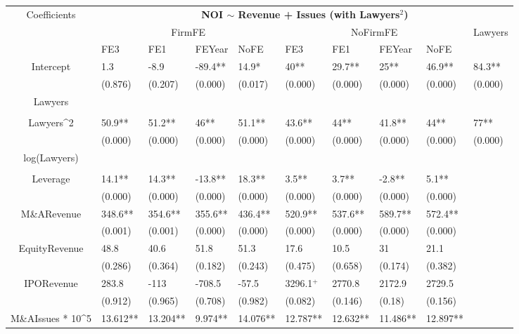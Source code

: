 \documentclass{article}
\begin{document}
\begin{table}[H]
\centering
\begin{tabular}{|clllllllll|}
\hline
\multirow{3}{*}{Coefficients} & \multicolumn{9}{c|}{\textbf{NOI $\sim$ Revenue + Issues (with Lawyers$^2$)}} \\
\cline{2-10}
& \multicolumn{4}{c}{FirmFE} & \multicolumn{4}{c}{NoFirmFE} & \multirow{2}{*}{Lawyers} \\
\cline{2-9}
& FE3 & FE1 & FEYear & NoFE & FE3 & FE1 & FEYear & NoFE &  \\
\hline
 
Intercept & 1.3 & -8.9 & -89.4** & 14.9* & 40** & 29.7** & 25** & 46.9** & 84.3** \\ 
   & (0.876) & (0.207) & (0.000) & (0.017) & (0.000) & (0.000) & (0.000) & (0.000) & (0.000) \\ 
  Lawyers &  &  &  &  &  &  &  &  &  \\ 
   &  &  &  &  &  &  &  &  &  \\ 
  Lawyers^2 & 50.9** & 51.2** & 46** & 51.1** & 43.6** & 44** & 41.8** & 44** & 77** \\ 
   & (0.000) & (0.000) & (0.000) & (0.000) & (0.000) & (0.000) & (0.000) & (0.000) & (0.000) \\ 
  log(Lawyers) &  &  &  &  &  &  &  &  &  \\ 
   &  &  &  &  &  &  &  &  &  \\ 
  Leverage & 14.1** & 14.3** & -13.8** & 18.3** & 3.5** & 3.7** & -2.8** & 5.1** &  \\ 
   & (0.000) & (0.000) & (0.000) & (0.000) & (0.000) & (0.000) & (0.000) & (0.000) &  \\ 
  M\&ARevenue & 348.6** & 354.6** & 355.6** & 436.4** & 520.9** & 537.6** & 589.7** & 572.4** &  \\ 
   & (0.001) & (0.001) & (0.000) & (0.000) & (0.000) & (0.000) & (0.000) & (0.000) &  \\ 
  EquityRevenue & 48.8 & 40.6 & 51.8 & 51.3 & 17.6 & 10.5 & 31 & 21.1 &  \\ 
   & (0.286) & (0.364) & (0.182) & (0.243) & (0.475) & (0.658) & (0.174) & (0.382) &  \\ 
  IPORevenue & 283.8 & -113 & -708.5 & -57.5 & 3296.1$^{+}$ & 2770.8 & 2172.9 & 2729.5 &  \\ 
   & (0.912) & (0.965) & (0.708) & (0.982) & (0.082) & (0.146) & (0.18) & (0.156) &  \\ 
  M\&AIssues * 10^5 & 13.612** & 13.204** & 9.974** & 14.076** & 12.787** & 12.632** & 11.486** & 12.897** &  \\ 

\end{tabular}
\end{table}
\end{document}
